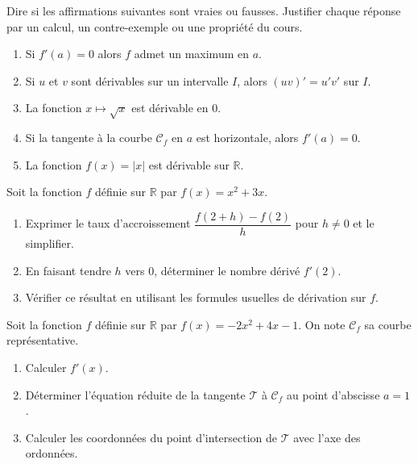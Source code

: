 \documentclass[11pt]{article}
\newcounter{popsec}
\newcounter{popsub}
\newcommand{\courssub}[1]{%
  \stepcounter{popsub}%
  \par\vspace{9pt}\noindent{\popxbold\fontsize{11.5}{13}\selectfont\color{popink}{\color{poporange}\thepopsec.\thepopsub}\hspace{6pt}#1}\par\nopagebreak\vspace{4pt}
}
\begin{document}
\begin{exercice}
Dire si les affirmations suivantes sont vraies ou fausses. Justifier chaque réponse par un calcul, un contre-exemple ou une propriété du cours.
\begin{enumerate}
    \item Si $f'(a) = 0$ alors $f$ admet un maximum en $a$.
    \item Si $u$ et $v$ sont dérivables sur un intervalle $I$, alors $(uv)' = u'v'$ sur $I$.
    \item La fonction $x \mapsto \sqrt{x}$ est dérivable en $0$.
    \item Si la tangente à la courbe $\mathcal{C}_f$ en $a$ est horizontale, alors $f'(a) = 0$.
    \item La fonction $f(x) = |x|$ est dérivable sur $\mathbb{R}$.
\end{enumerate}
\end{exercice}

\begin{exercice}
Soit la fonction $f$ définie sur $\mathbb{R}$ par $f(x) = x^2 + 3x$.
\begin{enumerate}
    \item Exprimer le taux d'accroissement $\dfrac{f(2+h) - f(2)}{h}$ pour $h \neq 0$ et le simplifier.
    \item En faisant tendre $h$ vers $0$, déterminer le nombre dérivé $f'(2)$.
    \item Vérifier ce résultat en utilisant les formules usuelles de dérivation sur $f$.
\end{enumerate}
\end{exercice}

\begin{exercice}
Soit la fonction $f$ définie sur $\mathbb{R}$ par $f(x) = -2x^2 + 4x - 1$. On note $\mathcal{C}_f$ sa courbe représentative.
\begin{enumerate}
    \item Calculer $f'(x)$.
    \item Déterminer l'équation réduite de la tangente $\mathcal{T}$ à $\mathcal{C}_f$ au point d'abscisse $a = 1$.
    \item Calculer les coordonnées du point d'intersection de $\mathcal{T}$ avec l'axe des ordonnées.
\end{enumerate}
\end{exercice}

\courssub{Je m'entraîne}
\end{document}
